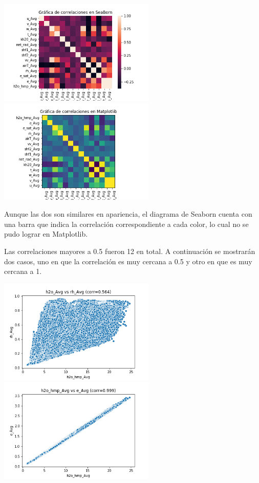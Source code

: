 \documentclass[letterpaper,12pt]{article}
\begin{document}
\begin{center}
	\includegraphics[height=5cm]{correlaciones_sns.png}\hspace*{\fill}
	\label{graf1}
   \includegraphics[height=5cm]{correlaciones_mpltlib.png}
    \label{graf2}
\end{center}

Aunque las dos son similares en apariencia, el diagrama de Seaborn cuenta con una barra que indica la correlación correspondiente a cada color, lo cual no se pudo lograr en Matplotlib.

Las correlaciones mayores a 0.5 fueron 12 en total. A continuación se mostrarán dos casos, uno en que la correlación es muy cercana a 0.5 y otro en que es muy cercana a 1.

\begin{center}
	\includegraphics[height=5cm]{corr12.png}\hspace*{\fill}
	\label{graf3}
   \includegraphics[height=5cm]{corr11.png}
    \label{graf4}
\end{center}
\end{document}

